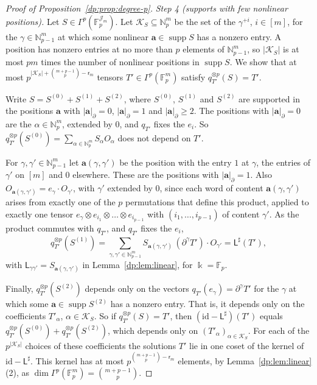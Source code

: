 \documentclass[11pt]{amsart}
\theoremstyle{definition}
\theoremstyle{remark}
\numberwithin{equation}{section}
\newcommand{\N}{\mathbb N}
\newcommand{\F}{\mathbb F}
\newcommand{\id}{\mathrm{id}}
\newcommand{\abs}[1]{\lvert #1\rvert}
\theoremstyle{plain}
\theoremstyle{definition}
\theoremstyle{plain}
\begin{document}
\begin{proof}[Proof of Proposition~\ref{dp:prop:degree-p}]
\emph{Step 4 (supports with few nonlinear positions).} Let $S\in\Gamma^p(\F_p^{\mathcal J_m})$. Let $\mathcal K_S\subseteq\N^m_p$ be the set of the $\gamma^{+i}$, $i\in[m]$, for the $\gamma\in\N^m_{p-1}$ at which some nonlinear $\mathbf a\in\operatorname{supp}S$ has a nonzero entry. A position has nonzero entries at no more than $p$ elements of $\N^m_{p-1}$, so $\abs{\mathcal K_S}$ is at most $pm$ times the number of nonlinear positions in $\operatorname{supp}S$. We show that at most $p^{\abs{\mathcal K_S}+\binom{m+p-1}p-\mathsf r_m}$ tensors $T'\in\Gamma^p(\F_p^m)$ satisfy $q_{T'}^{\otimes p}(S)=T'$.

Write $S=S^{(0)}+S^{(1)}+S^{(2)}$, where $S^{(0)}$, $S^{(1)}$ and $S^{(2)}$ are supported in the positions $\mathbf a$ with $\abs{\mathbf a}_\partial=0$, $\abs{\mathbf a}_\partial=1$ and $\abs{\mathbf a}_\partial\ge2$. The positions with $\abs{\mathbf a}_\partial=0$ are the $\alpha\in\N^m_p$, extended by $0$, and $q_{T'}$ fixes the $e_i$. So $q_{T'}^{\otimes p}(S^{(0)})=\sum_{\alpha\in\N^m_p}S_\alpha O_\alpha$ does not depend on $T'$.

For $\gamma,\gamma'\in\N^m_{p-1}$ let $\mathbf a(\gamma,\gamma')$ be the position with the entry $1$ at $\gamma$, the entries of $\gamma'$ on $[m]$ and $0$ elsewhere. These are the positions with $\abs{\mathbf a}_\partial=1$. Also $O_{\mathbf a(\gamma,\gamma')}=e_\gamma\cdot O_{\gamma'}$, with $\gamma'$ extended by $0$, since each word of content $\mathbf a(\gamma,\gamma')$ arises from exactly one of the $p$ permutations that define this product, applied to exactly one tensor $e_\gamma\otimes e_{i_1}\otimes\dots\otimes e_{i_{p-1}}$ with $(i_1,\dots,i_{p-1})$ of content $\gamma'$. As the product commutes with $q_{T'}$, and $q_{T'}$ fixes the $e_i$,
\[
 q_{T'}^{\otimes p}(S^{(1)})=\sum_{\gamma,\gamma'\in\N^m_{p-1}}S_{\mathbf a(\gamma,\gamma')}\,(\partial^\gamma T')\cdot O_{\gamma'}=\mathsf L^\sharp(T'),
\]
with $\mathsf L_{\gamma\gamma'}=S_{\mathbf a(\gamma,\gamma')}$ in Lemma~\ref{dp:lem:linear}, for $\Bbbk=\F_p$.

Finally, $q_{T'}^{\otimes p}(S^{(2)})$ depends only on the vectors $q_{T'}(e_\gamma)=\partial^\gamma T'$ for the $\gamma$ at which some $\mathbf a\in\operatorname{supp}S^{(2)}$ has a nonzero entry. That is, it depends only on the coefficients $T'_\alpha$, $\alpha\in\mathcal K_S$. So if $q_{T'}^{\otimes p}(S)=T'$, then $(\id-\mathsf L^\sharp)(T')$ equals $q_{T'}^{\otimes p}(S^{(0)})+q_{T'}^{\otimes p}(S^{(2)})$, which depends only on $(T'_\alpha)_{\alpha\in\mathcal K_S}$. For each of the $p^{\abs{\mathcal K_S}}$ choices of these coefficients the solutions $T'$ lie in one coset of the kernel of $\id-\mathsf L^\sharp$. This kernel has at most $p^{\binom{m+p-1}p-\mathsf r_m}$ elements, by Lemma~\ref{dp:lem:linear}(2), as $\dim\Gamma^p(\F_p^m)=\binom{m+p-1}p$.


\end{proof}
\end{document}
